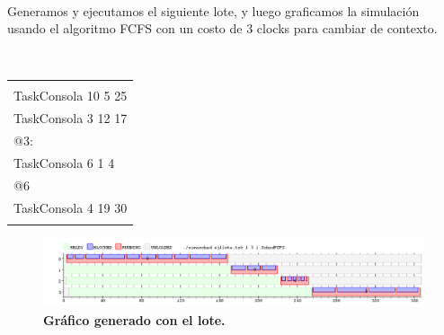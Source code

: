 ~

Generamos y ejecutamos el siguiente lote, y luego graficamos la simulación usando el algoritmo FCFS con un costo de 3 clocks para cambiar de contexto.

~

\begin{center}
	\begin{tabular}{|l|}
		\hline
							\\
		TaskConsola 10 5 25 \\
		TaskConsola 3 12 17 \\
		@3:					\\
		TaskConsola 6 1 4	\\
		@6					\\
		TaskConsola 4 19 30	\\
							\\
		\hline
	\end{tabular}
\end{center}

\begin{figure}[!h]
	\begin{center}
		\includegraphics[width=500px]{imagenes/ej1.png}
		\caption{\small{\textbf{Gráfico generado con el lote.}}}
		\label{fig:grafico_ej1}
	\end{center}
\end{figure}
